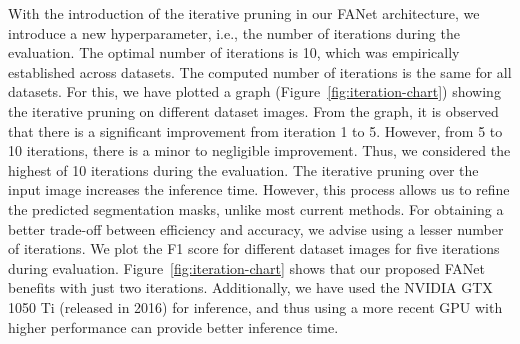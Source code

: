\documentclass[journal]{IEEEtran}
\begin{document}
With the introduction of the iterative pruning in our FANet architecture, we introduce a new hyperparameter, i.e., the number of iterations during the evaluation. The optimal number of iterations is 10, which was empirically established across datasets. The computed number of iterations is the same for all datasets. For this, we have plotted a graph (Figure~\ref{fig:iteration-chart}) showing the iterative pruning on different dataset images. From the graph, it is observed that there is a significant improvement from iteration 1 to 5. However, from 5 to 10 iterations, there is a minor to negligible improvement. Thus, we considered the highest of 10 iterations during the evaluation. The iterative pruning over the input image increases the inference time. However, this process allows us to refine the predicted segmentation masks, unlike most current methods. For obtaining a better trade-off between efficiency and accuracy, we advise using a lesser number of iterations. We plot the F1 score for different dataset images for five iterations during evaluation. Figure~\ref{fig:iteration-chart} shows that our proposed FANet benefits with just two iterations. Additionally, we have used the NVIDIA GTX 1050 Ti (released in 2016) for inference, and thus using a more recent GPU with higher performance can provide better inference time.
\section{\color{black}{Conclusion}}
\label{conclusion}
\end{document}
